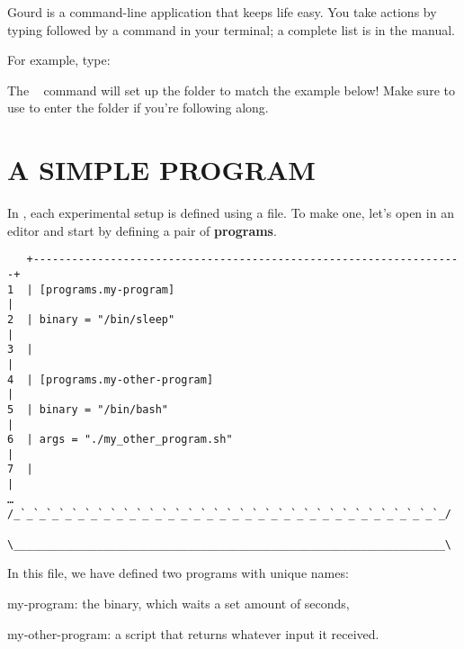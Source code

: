 \documentclass[a4paper,english]{article}
\begin{document}
\begin{adjustwidth}{18pt}{0pt}
    Gourd is a command-line application that keeps life easy.
    You take actions by typing  followed by a command in your terminal;
    a complete list is in the manual.

    For example, type:
    ~~~~

    The ~ command will set up the  folder to match
    the example below!
    Make sure to use  to enter the folder if you're following along.


    \section{A SIMPLE PROGRAM}

    In , each experimental setup is defined using a  file.
    To make one, let's open  in an editor and start by defining a pair
    of \textbf{programs}.

    \begin{verbatim}
   +-------------------------------------------------------------------+
1  | [programs.my-program]                                             |
2  | binary = "/bin/sleep"                                             |
3  |                                                                   |
4  | [programs.my-other-program]                                       |
5  | binary = "/bin/bash"                                              |
6  | args = "./my_other_program.sh"                                    |
7  |                                                                   |
…  /_`_`_`_`_`_`_`_`_`_`_`_`_`_`_`_`_`_`_`_`_`_`_`_`_`_`_`_`_`_`_`_`_`_/
   \___________________________________________________________________\

    \end{verbatim}

    In this file, we have defined two programs with unique names:
    \begin{Description}[programs]\setlength{\itemsep}{0cm}
    \item[my-program:] the  binary, which waits a set amount of seconds,
    \item[my-other-program:] a  script that returns whatever input it received.
    \end{Description}





\end{adjustwidth}
\end{document}
